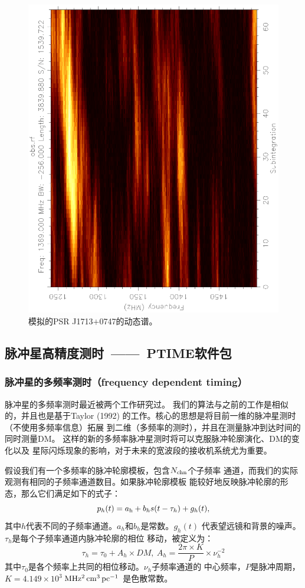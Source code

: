 \begin{figure}
\begin{center}
\includegraphics[width=3.5 in,angle=-90]{obsDyn.ps}
\end{center}
\caption{模拟的PSR J1713$+$0747的动态谱。}
\label{obs2}
\end{figure}

\subsection{脉冲星高精度测时\ ——\ PTIME软件包}

\subsubsection{脉冲星的多频率测时（frequency dependent timing）}

脉冲星的多频率测时最近被两个工作研究过\supercite{Pennucci14,Liu14}。
我们的算法与之前的工作是相似的，并且也是基于Taylor (1992)\supercite{Taylor92}
的工作。核心的思想是将目前一维的脉冲星测时（不使用多频率信息）拓展
到二维（多频率的测时），并且在测量脉冲到达时间的同时测量DM。
这样的新的多频率脉冲星测时将可以克服脉冲轮廓演化、DM的变化以及
星际闪烁现象的影响，对于未来的宽波段的接收机系统尤为重要。

假设我们有一个多频率的脉冲轮廓模板，包含$N_{\rm{chn}}$个子频率
通道，而我们的实际观测有相同的子频率通道数目。如果脉冲轮廓模板
能较好地反映脉冲轮廓的形态，那么它们满足如下的式子：
%
\begin{equation}
p_{h}(t)=a_{\rm{h}}+b_{h}s(t-\tau_{h})+g_{h}(t),
\end{equation}
%
其中$h$代表不同的子频率通道。$a_{h}$和$b_{h}$是常数。$g_{h}(t)$
代表望远镜和背景的噪声。$\tau_{h}$是每个子频率通道内脉冲轮廓的相位
移动，被定义为：
%
\begin{equation}
\tau_{h}=\tau_{0}+A_{h}\times DM,\ A_{h}=\frac{2\pi\times K}{P}\times\nu_{h}^{-2}
\end{equation}
%
其中$\tau_{0}$是各个频率上共同的相位移动。$\nu_{h}$子频率通道的
中心频率，$P$是脉冲周期，$K=4.149\times 10^{3}$\,$\rm{MHz^{2}\,cm^{3}\,pc^{-1}}$ 
是色散常数。

